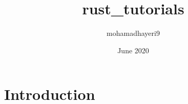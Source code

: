 \documentclass{article}
\title{rust_tutorials}
\author{mohamadhayeri9 }
\date{June 2020}
\begin{document}
\maketitle

\section{Introduction}
\end{document}
